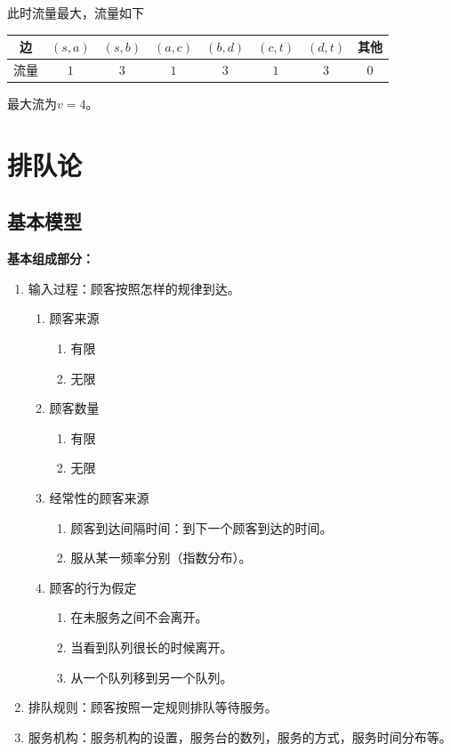 \documentclass[lang = cn, scheme = chinese, thmcnt = section]{elegantbook}
\begin{document}
\begin{solution}
	此时流量最大，流量如下
	\begin{table}[H]
		\centering
		\begin{tabular}{c|ccccccc}
			\hline
			边 & $(s,a)$ & $(s,b)$ & $(a,c)$ & $(b,d)$ & $(c,t)$ & $(d,t)$ & 其他 \\
			\hline
			流量 & $1$ & $3$ & $1$ & $3$ & $1$ & $3$ & $0$ \\ \hline
		\end{tabular}
	\end{table}	
	最大流为$v=4$。
\end{solution}

\chapter{排队论}

\section{基本模型}

\textbf{基本组成部分：}

\begin{enumerate}
	\item 输入过程：顾客按照怎样的规律到达。
	\begin{enumerate}
		\item 顾客来源
		\begin{enumerate}
			\item 有限
			\item 无限
		\end{enumerate}
		\item 顾客数量
		\begin{enumerate}
			\item 有限
			\item 无限
		\end{enumerate}
		\item 经常性的顾客来源
		\begin{enumerate}
			\item 顾客到达间隔时间：到下一个顾客到达的时间。
			\item 服从某一频率分别（指数分布）。
		\end{enumerate}
		\item 顾客的行为假定
		\begin{enumerate}
			\item 在未服务之间不会离开。
			\item 当看到队列很长的时候离开。
			\item 从一个队列移到另一个队列。
		\end{enumerate}
	\end{enumerate}
	\item 排队规则：顾客按照一定规则排队等待服务。
	\item 服务机构：服务机构的设置，服务台的数列，服务的方式，服务时间分布等。
\end{enumerate}
\end{document}
